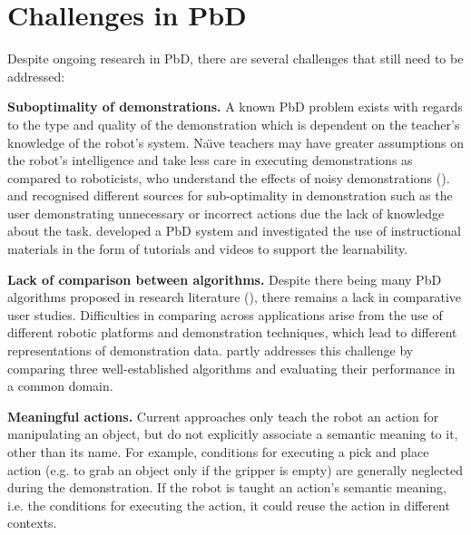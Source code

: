 \section{Challenges in PbD}\label{sssec:Challenges in PbD}
Despite ongoing research in PbD, there are several challenges that still need to be addressed:

\textbf{Suboptimality of demonstrations.}
A known PbD problem exists with regards to the type and quality of the demonstration which is dependent on the teacher's knowledge of the robot's system.
Na\"{\i}ve teachers may have greater assumptions on the robot's intelligence and take less care in executing demonstrations as compared to roboticists, who understand the effects of noisy demonstrations (\cite{suay2012practical}).
\cite{chen2003programing} and \cite{kaiser1995obtaining} recognised different sources for sub-optimality in demonstration such as the user demonstrating unnecessary or incorrect actions due the lack of knowledge about the task.
\cite{cakmak2014teaching} developed a PbD system and investigated the use of instructional materials in the form of tutorials and videos to support the learnability.

\textbf{Lack of comparison between algorithms.}
Despite there being many PbD algorithms proposed in research literature (\cite{argall2009survey,billing2010formalism}), there remains a lack in comparative user studies.
Difficulties in comparing across applications arise from the use of different robotic platforms and demonstration techniques, which lead to different representations of demonstration data.
\cite{suay2012practical} partly addresses this challenge by comparing three well-established algorithms and evaluating their performance in a common domain.

\textbf{Meaningful actions.}
Current approaches only teach the robot an action for manipulating an object, but do not explicitly associate a semantic meaning to it, other than its name.
For example, conditions for executing a pick and place action (e.g. to grab an object only if the gripper is empty) are generally neglected during the demonstration.
If the robot is taught an action's semantic meaning, i.e. the conditions for executing the action, it could reuse the action in different contexts.

